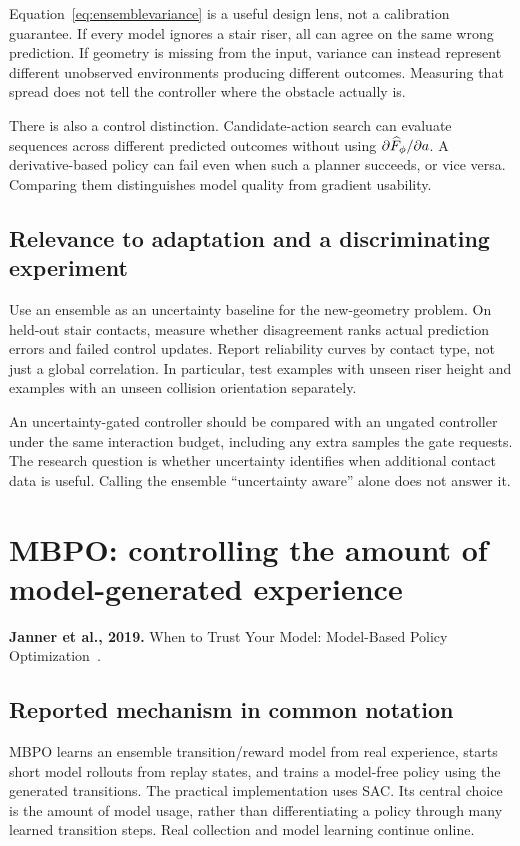 Equation~\eqref{eq:ensemblevariance} is a useful design lens, not a calibration
guarantee. If every model ignores a stair riser, all can agree on the same wrong
prediction. If geometry is missing from the input, variance can instead represent
different unobserved environments producing different outcomes. Measuring that
spread does not tell the controller where the obstacle actually is.

There is also a control distinction. Candidate-action search can evaluate
sequences across different predicted outcomes without using $\partial\widehat F_\phi/\partial a$.
A derivative-based policy can fail even when such a planner succeeds, or vice
versa. Comparing them distinguishes model quality from gradient usability.

\subsection{Relevance to adaptation and a discriminating experiment}
Use an ensemble as an uncertainty baseline for the new-geometry problem. On
held-out stair contacts, measure whether disagreement ranks actual prediction
errors and failed control updates. Report reliability curves by contact type,
not just a global correlation. In particular, test examples with unseen riser
height and examples with an unseen collision orientation separately.

An uncertainty-gated controller should be compared with an ungated controller
under the same interaction budget, including any extra samples the gate requests.
The research question is whether uncertainty identifies when additional contact
data is useful. Calling the ensemble ``uncertainty aware'' alone does not answer it.

\section{MBPO: controlling the amount of model-generated experience}\label{sec:mbpo}
\textbf{Janner et al., 2019.} When to Trust Your Model: Model-Based Policy
Optimization~\cite{mbpo}.

\subsection{Reported mechanism in common notation}
MBPO learns an ensemble transition/reward model from real experience, starts
short model rollouts from replay states, and trains a model-free policy using
the generated transitions. The practical implementation uses SAC. Its central
choice is the amount of model usage, rather than differentiating a policy through
many learned transition steps. Real collection and model learning continue online.

